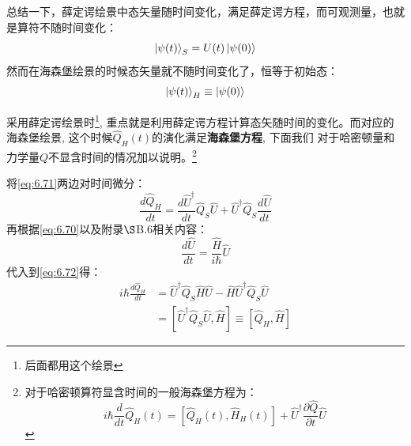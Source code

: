 \documentclass[a4paper,zihao=-4,linespread=1]{ctexrep}
\begin{document}
    总结一下，薛定谔绘景中态矢量随时间变化，满足薛定谔方程，而可观测量，也就是算符不随时间变化：
    \[\ket{\psi(t)}_S=U(t)\ket{\psi(0)}\]
    然而在海森堡绘景的时候态矢量就不随时间变化了，恒等于初始态：
    \[\ket{\psi(t)}_H\equiv \ket{\psi(0)}\]
    
    采用薛定谔绘景时\footnote{后面都用这个绘景}, 重点就是利用薛定谔方程计算态矢随时间的变化。而对应的海森堡绘景, 这个时候$\hat{Q}_H(t)$的演化满足\textbf{海森堡方程}, 下面我们
    对于哈密顿量和力学量$Q$不显含时间的情况加以说明。\footnote{对于哈密顿算符显含时间的一般海森堡方程为：\[i \hbar \frac{d}{d t} \hat{Q}_{H}(t)=\left[\hat{Q}_{H}(t), \hat{H}_{H}(t)\right]+\hat{U}^{\dagger} \frac{\partial \hat{Q}}{\partial t} \hat{U}\]}

    将\ref{eq:6.71}两边对时间微分：
    \begin{equation}
        \label{eq:6.72}
        \frac{d\hat{Q}_H}{dt}=\frac{d\hat{U}^\dagger}{dt}\hat{Q}_S\hat{U}+\hat{U}^\dagger\hat{Q}_S\frac{d\hat{U}}{dt}
    \end{equation}
    再根据\ref{eq:6.70}以及附录$\S$B.6相关内容：
    \begin{equation}
        \frac{d\hat{U}}{dt}=\frac{\hat{H}}{i\hbar}\hat{U}
    \end{equation}
    代入到\ref{eq:6.72}得：
    \begin{align*}
        i\hbar\frac{d\hat{Q}_H}{dt}&=\hat{U}^\dagger\hat{Q}_S\hat{H}\hat{U}-\hat{H}\hat{U}^\dagger\hat{Q}_S\hat{U}\\
        &=\left[\hat{U}^\dagger\hat{Q}_S\hat{U},\hat{H}\right]\equiv\left[\hat{Q}_H,\hat{H}\right]
    \end{align*}
\end{document}
